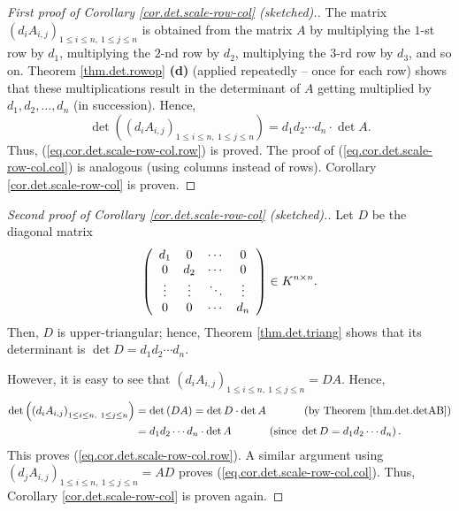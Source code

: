 \begin{proof}
[First proof of Corollary \ref{cor.det.scale-row-col} (sketched).]The matrix
$\left(  d_{i}A_{i,j}\right)  _{1\leq i\leq n,\ 1\leq j\leq n}$ is obtained
from the matrix $A$ by multiplying the $1$-st row by $d_{1}$, multiplying the
$2$-nd row by $d_{2}$, multiplying the $3$-rd row by $d_{3}$, and so on.
Theorem \ref{thm.det.rowop} \textbf{(d)} (applied repeatedly -- once for each
row) shows that these multiplications result in the determinant of $A$ getting
multiplied by $d_{1},d_{2},\ldots,d_{n}$ (in succession). Hence,%
\[
\det\left(  \left(  d_{i}A_{i,j}\right)  _{1\leq i\leq n,\ 1\leq j\leq
n}\right)  =d_{1}d_{2}\cdots d_{n}\cdot\det A.
\]
Thus, (\ref{eq.cor.det.scale-row-col.row}) is proved. The proof of
(\ref{eq.cor.det.scale-row-col.col}) is analogous (using columns instead of
rows). Corollary \ref{cor.det.scale-row-col} is proven.
\end{proof}

\begin{proof}
[Second proof of Corollary \ref{cor.det.scale-row-col} (sketched).]Let $D$ be
the diagonal matrix
\[
\left(
\begin{array}
[c]{cccc}%
d_{1} & 0 & \cdots & 0\\
0 & d_{2} & \cdots & 0\\
\vdots & \vdots & \ddots & \vdots\\
0 & 0 & \cdots & d_{n}%
\end{array}
\right)  \in K^{n\times n}.
\]
Then, $D$ is upper-triangular; hence, Theorem \ref{thm.det.triang} shows that
its determinant is $\det D=d_{1}d_{2}\cdots d_{n}$.

However, it is easy to see that $\left(  d_{i}A_{i,j}\right)  _{1\leq i\leq
n,\ 1\leq j\leq n}=DA$. Hence,%
\begin{align*}
\det\left(  \left(  d_{i}A_{i,j}\right)  _{1\leq i\leq n,\ 1\leq j\leq
n}\right)   &  =\det\left(  DA\right)  =\det D\cdot\det
A\ \ \ \ \ \ \ \ \ \ \left(  \text{by Theorem \ref{thm.det.detAB}}\right) \\
&  =d_{1}d_{2}\cdots d_{n}\cdot\det A\ \ \ \ \ \ \ \ \ \ \left(  \text{since
}\det D=d_{1}d_{2}\cdots d_{n}\right)  .
\end{align*}
This proves (\ref{eq.cor.det.scale-row-col.row}). A similar argument using
$\left(  d_{j}A_{i,j}\right)  _{1\leq i\leq n,\ 1\leq j\leq n}=AD$ proves
(\ref{eq.cor.det.scale-row-col.col}). Thus, Corollary
\ref{cor.det.scale-row-col} is proven again.
\end{proof}

